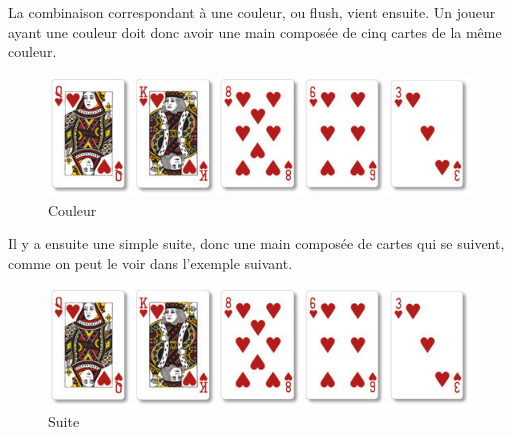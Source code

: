 \documentclass{report}
\begin{document}
La combinaison correspondant à une couleur, ou flush, vient ensuite. Un joueur ayant une couleur doit donc avoir une main composée de cinq cartes de la même couleur.\par

		\begin{figure}[h]
			\begin{center}
				\includegraphics[scale=0.3]{./imagesRapport/couleur.jpg}
			\end{center}
			\caption[Couleur]{Couleur}
		\end{figure}
		\medskip

\newpage
Il y a ensuite une simple suite, donc une main composée de cartes qui se suivent, comme on peut le voir dans l'exemple suivant.\par

		\begin{figure}[h]
			\begin{center}
				\includegraphics[scale=0.3]{./imagesRapport/suite.jpg}
			\end{center}
			\caption[Suite]{Suite}
		\end{figure}
		\medskip
\end{document}

